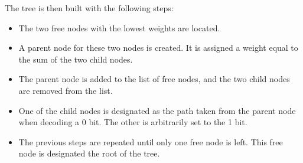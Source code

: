 \documentclass[12pt, a4paper]{report}
\begin{document}
The tree is then built with the following steps:

\begin{itemize}
    \item The two free nodes with the lowest weights are located.
    \item A parent node for these two nodes is created. It is assigned a weight equal to the sum of the two child nodes.
    \item The parent node is added to the list of free nodes, and the two child nodes are removed from the list.
    \item One of the child nodes is designated as the path taken from the parent node when decoding a 0 bit.
    The other is arbitrarily set to the 1 bit.
    \item The previous steps are repeated until only one free node is left. This free node is designated the root of the tree.
\end{itemize}
\end{document}
